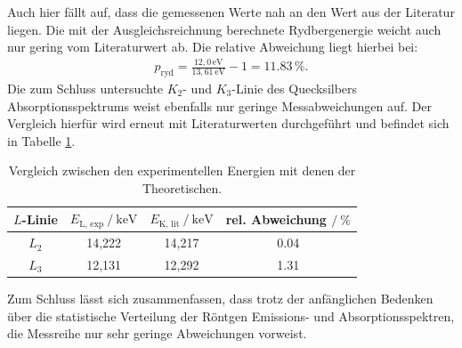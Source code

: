 \noindent Auch hier fällt auf, dass die gemessenen Werte nah an den Wert aus der Literatur liegen.
Die mit der Ausgleichsreichnung berechnete Rydbergenergie weicht auch nur gering vom Literaturwert\cite{kent} ab.
Die relative Abweichung liegt hierbei bei:
\begin{align*}
p_\text{ryd} = \frac{12,0\,\si{\electronvolt}}{13,61\,\si{\electronvolt}} -1 = \num{11,83}\,\%.
\end{align*}
Die zum Schluss untersuchte $K_2$- und $K_3$-Linie des Quecksilbers Absorptionsspektrums weist ebenfalls nur geringe Messabweichungen auf. Der Vergleich hierfür wird erneut mit Literaturwerten\cite{kent2}
durchgeführt und befindet sich in Tabelle \ref{tab:vergleich2}.
\begin{table}[H]
  \centering
  \caption{Vergleich zwischen den experimentellen Energien mit denen der Theoretischen.}
  \label{tab:vergleich2}
\begin{tabular}{c c c c}
  \toprule
$L$-Linie & $E_\text{L, exp}\:/\: \si{\kilo\electronvolt}$ & $E_\text{K, lit}\:/\: \si{\kilo\electronvolt}$ & rel. Abweichung $/\:\%$ \\
\midrule
$L_2$ & 14,222 & 14,217 & \num{0,04} \\
$L_3$ & 12,131 & 12,292 & \num{1,31} \\
\bottomrule
\end{tabular}
\end{table}
\noindent Zum Schluss lässt sich zusammenfassen, dass trotz der anfänglichen Bedenken über die statistische Verteilung der Röntgen Emissions- und Absorptionsspektren, die Messreihe nur sehr geringe
Abweichungen vorweist.

